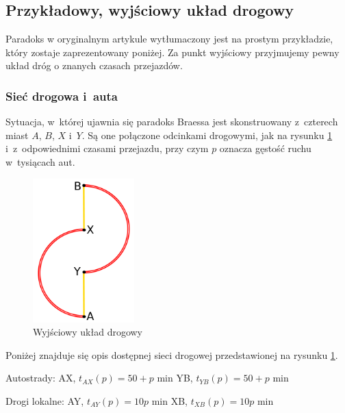 \documentclass[twoside,12pt]{report}
\begin{document}
\subsection{Przykładowy, wyjściowy układ drogowy}

Paradoks w oryginalnym artykule wytłumaczony jest na prostym przykładzie, który zostaje zaprezentowany poniżej. Za punkt wyjściowy przyjmujemy pewny układ dróg o znanych czasach przejazdów.

\subsubsection{Sieć drogowa i~auta}

Sytuacja, w~której ujawnia się paradoks Braessa jest skonstruowany z~czterech miast $A$, $B$, $X$ i~$Y$. Są one połączone odcinkami drogowymi, jak na rysunku \ref{fig:wyjsciowy_uklad_drogowy} i~z~odpowiednimi czasami przejazdu, przy czym $p$ oznacza gęstość ruchu w~tysiącach aut.

\begin{figure}[htbp]
	\centering
	\includegraphics[width=0.35\textwidth]{img/braess1}
	\caption{Wyjściowy układ drogowy}
	\label{fig:wyjsciowy_uklad_drogowy}
\end{figure}

Poniżej znajduje się opis dostępnej sieci drogowej przedstawionej na rysunku \ref{fig:wyjsciowy_uklad_drogowy}.

Autostrady:\newline
AX, $t_{AX}(p) =  50 + p$ min\newline
YB, $t_{YB}(p) =  50 + p$ min\newline

Drogi lokalne:\newline
AY, $t_{AY}(p) =  10p$ min\newline
XB, $t_{XB}(p) =  10p$ min\newline
\end{document}
